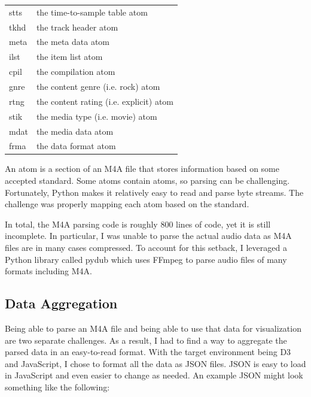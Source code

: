 \documentclass[journal]{vgtc}                %
\begin{document}
\begin{table}[h]
\begin{tabu}{l l}
    stts & the time-to-sample table atom \\
    tkhd & the track header atom \\
    meta & the meta data atom \\
    ilst & the item list atom \\
    cpil & the compilation atom \\
    gnre & the content genre (i.e. rock) atom \\
    rtng & the content rating (i.e. explicit) atom \\
    stik & the media type (i.e. movie) atom \\
    mdat & the media data atom \\
    frma & the data format atom \\
  \midrule
  \end{tabu}%
\end{table}

An atom is a section of an M4A file that stores information based on some accepted
standard. Some atoms contain atoms, so parsing can be challenging. Fortunately,
Python makes it relatively easy to read and parse byte streams. The challenge
was properly mapping each atom based on the standard.

In total, the M4A parsing code is roughly 800 lines of code, yet it is still
incomplete. In particular, I was unable to parse the actual audio data as
M4A files are in many cases compressed. To account for this setback, I leveraged
a Python library called pydub which uses FFmpeg to parse audio files of many
formats including M4A.

\subsection{Data Aggregation}

Being able to parse an M4A file and being able to use that data for visualization
are two separate challenges. As a result, I had to find a way to aggregate the
parsed data in an easy-to-read format. With the target environment being D3
and JavaScript, I chose to format all the data as JSON files. JSON is easy
to load in JavaScript and even easier to change as needed. An example JSON
might look something like the following:
\end{document}
